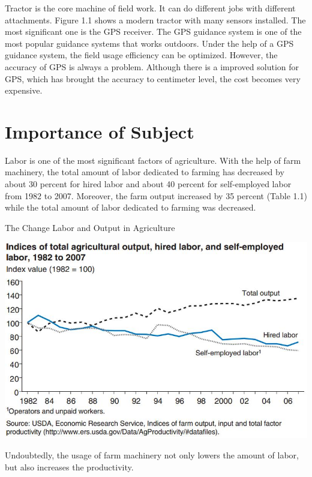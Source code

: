 Tractor is the core machine of field work. It can do different jobs with different attachments. Figure  1.1 shows a modern tractor with many sensors installed. The most significant one is the GPS receiver. The GPS guidance system is one of the most popular guidance systems that works outdoors. Under the help of a GPS guidance system, the field usage efficiency can be optimized. However, the accuracy of GPS is always a problem. Although there is a improved solution for GPS, which has brought the accuracy to centimeter level, the cost becomes very expensive.

\section{Importance of Subject}

Labor is one of the most significant factors of agriculture. With the help of farm machinery, the total amount of labor dedicated to farming has decreased by about 30 percent for hired labor and about 40 percent for self-employed labor from 1982 to 2007. Moreover, the farm output increased by 35 percent (Table 1.1) while the total amount of labor dedicated to farming was decreased. \cite{o2011changing} %
\begin{table}[ht!]
\begin{center}
\caption{The Change Labor and Output in Agriculture}
\includegraphics[scale = 0.7]{pics/laborandoutput.jpg}
\end{center}
\end{table}
Undoubtedly, the usage of farm machinery not only lowers the amount of labor, but also increases the productivity. 

